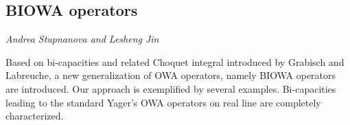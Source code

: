 \documentclass[../booklet.tex]{subfiles}
\begin{document}
\subsection[BIOWA operators. {\it Andrea Stupnanova and Lesheng Jin}]{BIOWA operators}
 

\begin{center}
  {\it Andrea Stupnanova and Lesheng Jin}
\end{center}

\vskip 0.8cm


Based on bi-capacities and related Choquet integral introduced by Grabisch and Labreuche, a new generalization of OWA operators, namely BIOWA operators are introduced. Our approach is exemplified by several examples. Bi-capacities leading to the standard Yager's OWA operators on real line are completely characterized.
\\
\end{document}
